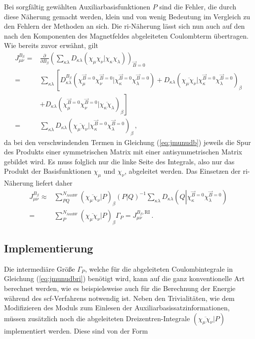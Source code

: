 	Bei sorgfältig gewählten Auxiliarbasisfunktionen $P$ sind die Fehler, die durch diese Näherung gemacht werden, klein und von wenig Bedeutung\supercite{eichkorn1995auxiliary} im Vergleich zu den Fehlern der Methoden an sich. Die \ac{ri}-Näherung lässt sich nun auch auf den nach den Komponenten des Magnetfeldes abgeleiteten Coulombterm übertragen. Wie bereits zuvor erwähnt, gilt
	\begin{equation}\label{eq:jmunudb}
	\begin{aligned}
	J_{\mu\nu}^{B_\beta}=&\frac{\partial}{\partial B_\beta}\left(\sum_{\kappa\lambda}D_{\kappa\lambda}\left(\chi_\mu\chi_\nu\vert\chi_\kappa\chi_\lambda\right)\right)_{\vec{B}=0}\\
	=&\sum_{\kappa\lambda}\left[D_{\kappa\lambda}^{B_\beta}\left(\chi_\mu^{\vec{B}=0}\chi_\nu^{\vec{B}=0}\vert\chi_\kappa^{\vec{B}=0}\chi_\lambda^{\vec{B}=0}\right)+D_{\kappa\lambda}\left(\overline{\chi_\mu\chi_\nu}\vert\chi_\kappa^{\vec{B}=0}\chi_\lambda^{\vec{B}=0}\right)_{\beta}\right.\\
    &+\left.D_{\kappa\lambda}\left(\chi_\mu^{\vec{B}=0}\chi_\nu^{\vec{B}=0}\vert\overline{\chi_\kappa\chi_\lambda}\right)_{\beta}\right]\\
    =&\sum_{\kappa\lambda}D_{\kappa\lambda}\left(\overline{\chi_\mu\chi_\nu}\vert\chi_\kappa^{\vec{B}=0}\chi_\lambda^{\vec{B}=0}\right)_{\beta}\, ,
	\end{aligned}
	\end{equation}
	da bei den verschwindenden Termen in Gleichung (\ref{eq:jmunudb}) jeweils die Spur des Produkts einer symmetrischen Matrix mit einer antisymmetrischen Matrix gebildet wird. Es muss folglich nur die linke Seite des Integrals, also nur das Produkt der Basisfunktionen $\chi_\mu$ und $\chi_\nu$, abgeleitet werden. Das Einsetzen der \ac{ri}-Näherung liefert daher
	\begin{equation}\label{eq:jmunudbri}
	\begin{aligned}
	J_{\mu\nu}^{B_\beta}\approx &\sum_{PQ}^{N_{\textrm{AuxBF}}}\left(\overline{\chi_\mu\chi_\nu}\vert P\right)_\beta\left(P\vert Q\right)^{-1}\sum_{\kappa\lambda}D_{\kappa\lambda}\left(Q\left\vert\chi_\kappa^{\vec{B}=0}\chi_\lambda^{\vec{B}=0}\right.\right)\\
	=&\sum_{P}^{N_{\textrm{AuxBF}}}\left(\overline{\chi_\mu\chi_\nu}\vert P\right)_\beta\Gamma_P=J_{\mu\nu}^{B_\beta ,\textrm{RI}}\, .
	\end{aligned}
	\end{equation}
	\subsection{Implementierung}
	Die intermediäre Größe $\Gamma_P$, welche für die abgeleiteten Coulombintegrale in Gleichung (\ref{eq:jmunudbri}) benötigt wird, kann auf die ganz konventionelle Art berechnet werden, wie es beispielsweise auch für die Berechnung der Energie während des \ac{scf}-Verfahrens notwendig ist. Neben den Trivialitäten, wie dem Modifizieren des Moduls zum Einlesen der Auxiliarbasissatzinformationen, müssen zusätzlich noch die abgeleiteten Dreizentren-Integrale $\left(\overline{\chi_\mu\chi_\nu}\vert P\right)$ implementiert werden. Diese sind von der Form
	
